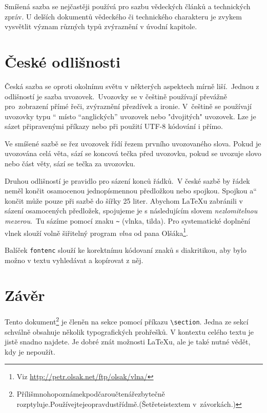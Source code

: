 \documentclass[twocolumn, 10pt]{article}
\newcommand{\uv}[1]{\quotedblbase #1\textquotedblleft}
\begin{document}
Smíšená sazba se nejčastěji používá pro sazbu vědeckých článků a technických zpráv. U delších dokumentů vědeckého či technického charakteru je zvykem vysvětlit význam různých typů zvýraznění v úvodní kapitole.


\section{České odlišnosti}

Česká sazba se oproti okolnímu světu v některých aspektech mírně liší.\ Jednou z odlišností je sazba uvozovek.\ Uvozovky se v češtině používají převážně pro~zobrazení přímé řeči, zvýraznění přezdívek a ironie. V~češtině se používají uvozovky typu \uv{9966} místo ``anglických'' uvozovek nebo "dvojitých" uvozovek. Lze je sázet připravenými příkazy nebo při použití UTF-8 kódování i přímo.

Ve smíšené sazbě se řez uvozovek řídí řezem prvního uvozovaného slova. Pokud je uvozována celá věta, sází se koncová tečka před uvozovku, pokud se uvozuje slovo nebo část věty, sází se tečka za uvozovku.

Druhou odlišností je pravidlo pro sázení konců řádků.\ V české sazbě by řádek neměl končit osa\-mocenou jednopísmennou předložkou nebo spojkou. Spoj\-kou \uv{a} končit může pouze při sazbě do šířky 25 liter. Abychom \LaTeX u zabránili v sázení osamocených předložek, spojujeme je s následujícím slovem \textit{nezlomitelnou mezerou}.\ Tu sázíme pomocí znaku \texttt{\~{}} (vlnka, tilda). Pro systematické doplnění vlnek slouží volně šiřitelný program\textit{ vlna} od pana Olšáka\footnote{Viz \url{ http://petr.olsak.net/ftp/olsak/vlna/}}.

Balíček \texttt{fontenc} slouží ke korektnímu kódovaní znaků s diakritikou, aby bylo možno v textu vyhledávat a kopírovat z něj.

\section{Závěr}

Tento dokument\footnote{Příliš\hspace{1mm}mnoho\hspace{1mm}poznámek\hspace{1mm}pod\hspace{1mm}čarou\hspace{1mm}čtenáře\hspace{1mm}zbytečně rozptyluje.\hspace{1mm}Používejte\hspace{1mm}je\hspace{1mm}opravdu\hspace{1mm}střídmě.\hspace{1mm}(Šetřete\hspace{1mm}i\hspace{1mm}s\hspace{1mm}textem v~závorkách.)}
je členěn na sekce pomocí příkazu \verb|\section|. Jedna ze sekcí schválně obsahuje několik typografických prohřešků. V kontextu celého textu je jistě snadno najdete. Je dobré znát možnosti \LaTeX u, ale je také nutné vědět, kdy je nepoužít.
\end{document}
